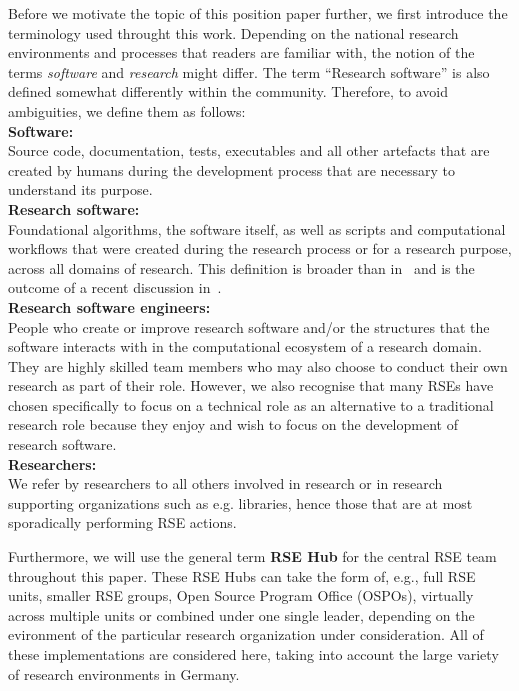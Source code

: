 \documentclass[a4paper]{article}
\makeatletter
\newcommand*{\eg}{e.g.\@\xspace}
\makeatother
\begin{document}
Before we motivate the topic of this position paper further, we first introduce the terminology used throught this work.
Depending on the national research
environments and processes that readers are familiar with, the notion of the terms \emph{software} and \emph{research} might differ.
The term “Research software” is also defined somewhat differently within the community.
Therefore, to avoid ambiguities, we define them as follows:\\
\textbf{Software:}\\
Source code, documentation, tests, executables
and all other artefacts that are created by humans during the development process
that are necessary to understand its purpose.\\
\textbf{Research software:}\\
Foundational algorithms, the software itself,
as well as scripts and computational workflows that were created
during the research process or for a research purpose, across all domains of research.
This definition is broader than in~\autocite{FAIR4RS} and is the outcome of a recent
discussion in~\autocite{Gruenpeter2021}.\\
\textbf{Research software engineers:}\\
People who
create or improve research software and/or the structures that the software interacts with
in the computational ecosystem of a research domain.
They are highly skilled team members who may also choose to conduct their own research as
part of their role.
However, we also recognise that many RSEs have chosen specifically to focus on a technical
role as an alternative to a traditional research role because they enjoy and wish to focus
on the development of research software.\\
\textbf{Researchers:}\\
We refer by researchers to all others involved in research or in research supporting organizations such as \eg{} libraries,
hence those that are at most sporadically performing RSE actions.

Furthermore, we will use the general term \textbf{RSE Hub} for the central RSE team throughout this paper.
These RSE Hubs can take the form of, e.g., full RSE units, smaller RSE groups, Open Source Program Office (OSPOs), virtually across multiple units or combined under one single leader, depending on the evironment of the particular research organization under consideration.
All of these implementations are considered here, taking into account the large variety of research environments in Germany.
\end{document}

